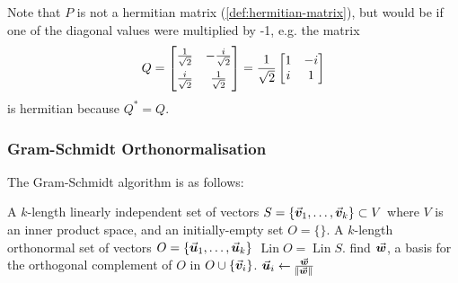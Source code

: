 \documentclass[../MathsNotesBase.tex]{subfiles}
\begin{document}
{\begin{exe}
{				\nl Note that $P$ is not a hermitian matrix (\ref{def:hermitian-matrix}), but would be if one of the diagonal values were multiplied by -1, e.g. the matrix
				\[ 
				Q = \begin{bmatrix}
					\frac{1}{\sqrt{2}} & -\frac{i}{\sqrt{2}}\nn
					\frac{i}{\sqrt{2}} & \frac{1}{\sqrt{2}}
				\end{bmatrix} =
				\frac{1}{\sqrt{2}}
				\begin{bmatrix}
					1 & -i\\
					i & 1
				\end{bmatrix}
				\]
				is hermitian because ${ Q^* = Q }$.
			}
		\end{exe}
		
		
		\biggerskip
		\subsubsection{Gram-Schmidt Orthonormalisation}\label{sssection:gram-schmidt-orthonormalisation}
		
		\biggerskip
		The Gram-Schmidt algorithm is as follows:
		\begin{algorithm}
			\begin{algorithmic}
				\REQUIRE A $k$-length linearly independent set of vectors ${ S = \{\vec{\bm{v}}_1,\dots,\vec{\bm{v}}_k\} \subset V }$ where $V$ is an inner product space, and an initially-empty set ${ O = \{\} }$.
				\ENSURE A $k$-length orthonormal set of vectors ${ O = \{\vec{\bm{u}}_1, \dots, \vec{\bm{u}}_k \} }$ \suchthat ${ \operatorname{Lin} O = \operatorname{Lin} S }$.
				\STATE %
				\STATE find $\vec{\bm{w}}$, a basis for the orthogonal complement of $O$ in ${ O \cup \{\vec{\bm{v}}_i\} }$.
				\STATE ${ \vec{\bm{u}}_i \leftarrow \frac{\vec{\bm{w}}}{\norm{\vec{\bm{w}}}} }$
				\ENDFOR 
			\end{algorithmic}	
		\end{algorithm}
		
}
\end{document}
